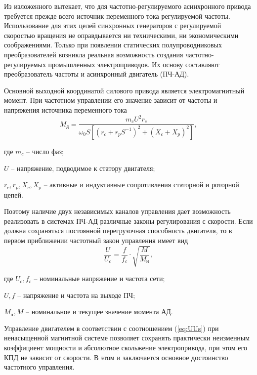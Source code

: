         Из изложенного вытекает, что для частотно-регулируемого асинхронного
        привода требуется прежде всего источник переменного тока регулируемой
        частоты. Использование для этих целей синхронных генераторов с
        регулируемой скоростью вращения не оправдывается ни техническими, ни
        экономическими соображениями. Только при появлении статических
        полупроводниковых преобразователей возникла реальная возможность
        создания частотно-регулируемых промышленных электроприводов. Их основу
        составляют преобразователь частоты и асинхронный двигатель (ПЧ-АД).
        
        Основной выходной координатой силового привода является
        электромагнитный момент. При частотном управлении его значение зависит
        от частоты и напряжения источника переменного тока
        \begin{equation}
            \label{eq:Md}
            M_\text{д} = \frac{m_c U^2 r_c}{\omega_0 S \left[ (r_c+r_p S^{-1})^2+
                (X_c+X_p)^2\right]},
        \end{equation}

        где $m_c$ -- число фаз;

        $U$ -- напряжение, подводимое к статору двигателя;

        $r_c, r_p, X_c, X_p$ -- активные и индуктивные сопротивления статорной
        и роторной цепей.

        Поэтому наличие двух независимых каналов управления дает возможность
        реализовать в системах ПЧ-АД различные законы регулирования с скорости.
        Если должна сохраняться постоянной перегрузочная способность двигателя,
        то в первом приближении частотный закон управления имеет вид
        \begin{equation}
            \label{eq:UUs}
            \frac{U}{U_c} = \frac{f}{f_c} \cdot \sqrt{\frac{M}{M_\text{н}}},
        \end{equation}

        где $U_c, f_c$ -- номинальные напряжение и частота сети;

        $U, f$ -- напряжение и частота на выходе ПЧ;

        $M_\text{н}, M$ -- номинальное и текущее значение момента АД.

        Управление двигателем в соответствии с соотношением (\ref{eq:UUs}) при
        ненасыщенной магнитной системе позволяет сохранять практически
        неизменным коэффициент мощности и абсолютное скольжение электропривода,
        при этом его КПД не зависит от скорости. В этом и заключается основное
        достоинство частотного управления.

